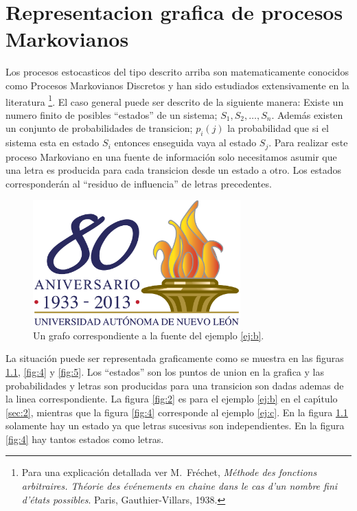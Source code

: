 \chapter{Representacion grafica de procesos Markovianos}
\label{sec:4}

Los procesos estocasticos del tipo descrito arriba son matematicamente
conocidos como Procesos Markovianos Discretos y han sido estudiados
extensivamente en la literatura \footnote{Para una explicaci\'{o}n
  detallada ver M.\ Fr\'{e}chet, {\em M\'{e}thode des fonctions
    arbitraires. Th\'{e}orie des \'{e}v\'{e}nements en chaine dans le
    cas d'un nombre fini d'\'{e}tats possibles}. Paris,
  Gauthier-Villars, 1938.}.  El caso general puede ser descrito de la
siguiente manera: Existe un numero finito de posibles ``estados'' de
un sistema; $S_{1}, S_{2}, \ldots, S_{n}$. Adem\'{a}s existen un
conjunto de probabilidades de transicion; $p_{i}(j)$ la probabilidad
que si el sistema esta en estado $S_{i}$ entonces enseguida vaya al
estado $S_{j}$. Para realizar este proceso Markoviano en una fuente de
informaci\'{o}n solo necesitamos asumir que una letra es producida
para cada transicion desde un estado a otro. Los estados
corresponder\'{a}n al ``residuo de influencia'' de letras precedentes.

\begin{figure}[!ht]
\centerline{\includegraphics[width=80mm]{ejemplo.png}}
\caption{Un grafo correspondiente a la fuente del ejemplo \ref{ej:b}.}
\label{fig:3}
\end{figure}

La situaci\'{o}n puede ser representada graficamente como se muestra
en las figuras \ref{fig:3}, \ref{fig:4} y \ref{fig:5}. Los ``estados''
son los puntos de union en la grafica y las probabilidades y letras
son producidas para una transicion son dadas ademas de la linea
correspondiente. La figura \ref{fig:2} es para el ejemplo \ref{ej:b}
en el cap\'{\i}tulo \ref{sec:2}, mientras que la figura \ref{fig:4}
corresponde al ejemplo \ref{ej:c}. En la figura \ref{fig:3} solamente
hay un estado ya que letras sucesivas son independientes. En la figura
\ref{fig:4} hay tantos estados como letras.

